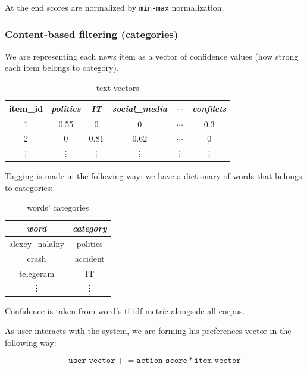 \documentclass{article}
\begin{document}
At the end scores are normalized by \texttt{min-max} normalization.


\subsubsection{Content-based filtering (categories)}

We are representing each news item as a vector of confidence values (how strong each item belongs to category).

\begin{table}[h]
    \centering
    \begin{tabular}{cccccc}
        \toprule
        item\_id & \textit{politics} & \textit{IT} & \textit{social\_media} & $\cdots$ & \textit{confilcts} \\
        \midrule
        1 & 0.55 & 0 & 0 & $\cdots$ & 0.3 \\
        2 & 0    & 0.81  & 0.62 & $\cdots$ & 0 \\
        \vdots & \vdots & \vdots & \vdots & \vdots & \vdots\\

        \bottomrule
    \end{tabular}%
    \caption{text vectors}
    \label{tab:text_vectors}
\end{table}

Tagging is made in the following way: we have a dictionary of words that belongs to categories:

\begin{table}[h]
    \centering
    \begin{tabular}{cc}
        \toprule
        \textit{word} & \textit{category} \\
        \midrule
        alexey\_nalalny & politics \\
        crash & accident \\
        telegeram & IT \\
        \vdots & \vdots \\
        \bottomrule
    \end{tabular}%
    \caption{words' categories}
    \label{tab:words_categories}
\end{table}

Confidence is taken from word's tf-idf metric alongside all corpus.

As user interacts with the system, we are forming his preferences vector in the following way:

\begin{equation}
    \texttt{user\_vector} \mathrel{+}= \texttt{action\_score} * \texttt{item\_vector}
\end{equation}
\end{document}
